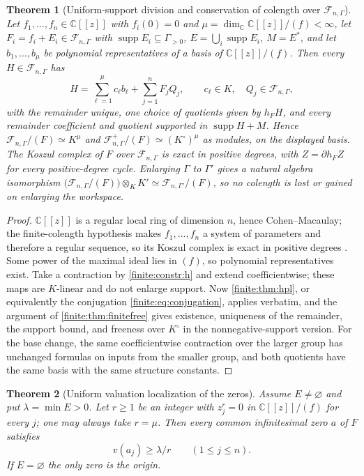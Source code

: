 \documentclass[11pt,letterpaper]{article}
\newtheorem{theorem}{Theorem}[section]
\theoremstyle{definition}
\theoremstyle{remark}
\newcommand{\C}{\mathbb C}
\newcommand{\Af}{\mathscr F}
\newcommand{\Kc}{K^{\circ}}
\DeclareMathOperator{\supp}{supp}
\numberwithin{equation}{section}
\begin{document}
\begin{theorem}[Uniform-support division and conservation of colength over $\Af_{n,\Gamma}$]
\label{finite:thm:formaldivision}
Let $f_1,\ldots,f_n\in\C[[z]]$ with $f_i(0)=0$ and $\mu=\dim_\C\C[[z]]/(f)<\infty$, let $F_i=f_i+E_i\in\Af_{n,\Gamma}$ with $\supp E_i\subseteq\Gamma_{>0}$, $E=\bigcup_i\supp E_i$, $M=E^*$, and let $b_1,\ldots,b_\mu$ be polynomial representatives of a basis of $\C[[z]]/(f)$. Then every $H\in\Af_{n,\Gamma}$ has
\begin{equation}\label{finite:eq:formaldivision}
 H=\sum_{\ell=1}^{\mu}c_\ell b_\ell+\sum_{j=1}^{n}F_jQ_j,
 \qquad c_\ell\in K,\quad Q_j\in\Af_{n,\Gamma},
\end{equation}
with the remainder unique, one choice of quotients given by $h_FH$, and every remainder coefficient and quotient supported in $\supp H+M$. Hence $\Af_{n,\Gamma}/(F)\simeq K^\mu$ and $\Af^+_{n,\Gamma}/(F)\simeq(\Kc)^\mu$ as modules, on the displayed basis. The Koszul complex of $F$ over $\Af_{n,\Gamma}$ is exact in positive degrees, with $Z=\partial h_FZ$ for every positive-degree cycle. Enlarging $\Gamma$ to $\Gamma'$ gives a natural algebra isomorphism $\bigl(\Af_{n,\Gamma}/(F)\bigr)\otimes_K K'\simeq\Af_{n,\Gamma'}/(F)$, so no colength is lost or gained on enlarging the workspace.
\end{theorem}

\begin{proof}
$\C[[z]]$ is a regular local ring of dimension $n$, hence Cohen--Macaulay; the finite-colength hypothesis makes $f_1,\ldots,f_n$ a system of parameters and therefore a regular sequence, so its Koszul complex is exact in positive degrees \cite{finite:StacksKoszul}. Some power of the maximal ideal lies in $(f)$, so polynomial representatives exist. Take a contraction by \cref{finite:constr:h} and extend coefficientwise; these maps are $K$-linear and do not enlarge support. Now \cref{finite:thm:hpl}, or equivalently the conjugation \eqref{finite:eq:conjugation}, applies verbatim, and the argument of \cref{finite:thm:finitefree} gives existence, uniqueness of the remainder, the support bound, and freeness over $\Kc$ in the nonnegative-support version. For the base change, the same coefficientwise contraction over the larger group has unchanged formulas on inputs from the smaller group, and both quotients have the same basis with the same structure constants.
\end{proof}

\begin{theorem}[Uniform valuation localization of the zeros]
\label{finite:thm:localization}
Assume $E\neq\varnothing$ and put $\lambda=\min E>0$. Let $r\geq1$ be an integer with $z_j^r=0$ in $\C[[z]]/(f)$ for every $j$; one may always take $r=\mu$. Then every common infinitesimal zero $a$ of $F$ satisfies
\begin{equation}\label{finite:eq:rootbound}
 v(a_j)\geq\lambda/r\qquad(1\leq j\leq n).
\end{equation}
If $E=\varnothing$ the only zero is the origin.
\end{theorem}
\end{document}
